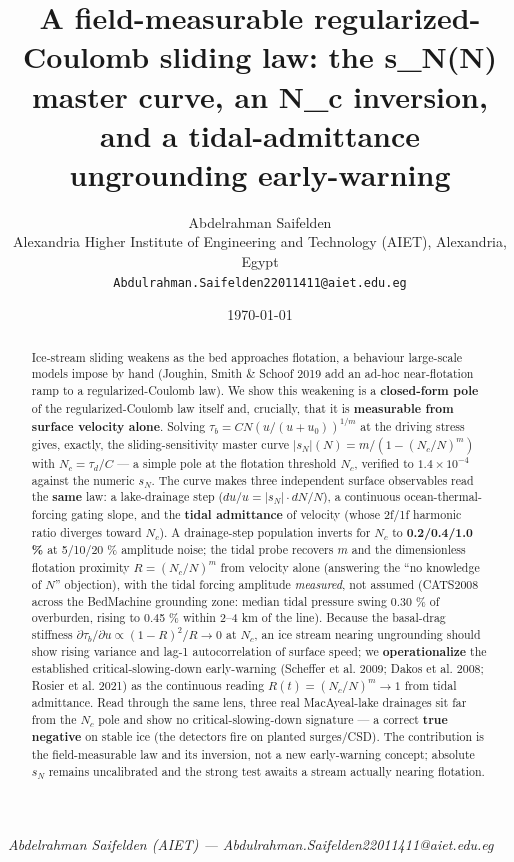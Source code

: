 \documentclass[11pt]{article}
\title{A field-measurable regularized-Coulomb sliding law: the s\_N(N) master curve, an N\_c inversion, and a tidal-admittance ungrounding early-warning}
\author{Abdelrahman Saifelden\\ Alexandria Higher Institute of Engineering and Technology (AIET), Alexandria, Egypt\\ \texttt{Abdulrahman.Saifelden22011411@aiet.edu.eg}}
\date{\today}
\begin{document}
\maketitle

\emph{Abdelrahman Saifelden (AIET) — Abdulrahman.Saifelden22011411@aiet.edu.eg}


\begin{abstract}


Ice-stream sliding weakens as the bed approaches flotation, a behaviour large-scale models impose by hand (Joughin, Smith \& Schoof 2019 add an ad-hoc near-flotation ramp to a regularized-Coulomb law). We show this weakening is a \textbf{closed-form pole} of the regularized-Coulomb law itself and, crucially, that it is \textbf{measurable from surface velocity alone}. Solving $\tau _{b}=C N (u/(u+u_{0}))^{1/m}$ at the driving stress gives, exactly, the sliding-sensitivity master curve $|s_{N}|(N)=m/(1-(N_{c}/N)^{m})$ with $N_{c}=\tau _{d}/C$ — a simple pole at the flotation threshold $N_{c}$, verified to $1.4\times 10^{-4}$ against the numeric $s_{N}$. The curve makes three independent surface observables read the \textbf{same} law: a lake-drainage step ($du/u=|s_{N}|\cdot dN/N$), a continuous ocean-thermal-forcing gating slope, and the \textbf{tidal admittance} of velocity (whose 2f/1f harmonic ratio diverges toward $N_{c}$). A drainage-step population inverts for $N_{c}$ to \textbf{0.2/0.4/1.0 \%} at 5/10/20 \% amplitude noise; the tidal probe recovers $m$ and the dimensionless flotation proximity $R=(N_{c}/N)^{m}$ from velocity alone (answering the ``no knowledge of $N$'' objection), with the tidal forcing amplitude \emph{measured}, not assumed (CATS2008 across the BedMachine grounding zone: median tidal pressure swing 0.30 \% of overburden, rising to 0.45 \% within 2–4 km of the line). Because the basal-drag stiffness $\partial \tau _{b}/\partial u\propto (1-R)^{2}/R\to 0$ at $N_{c}$, an ice stream nearing ungrounding should show rising variance and lag-1 autocorrelation of surface speed; we \textbf{operationalize} the established critical-slowing-down early-warning (Scheffer et al. 2009; Dakos et al. 2008; Rosier et al. 2021) as the continuous reading $R(t)=(N_{c}/N)^{m}\to 1$ from tidal admittance. Read through the same lens, three real MacAyeal-lake drainages sit far from the $N_{c}$ pole and show no critical-slowing-down signature — a correct \textbf{true negative} on stable ice (the detectors fire on planted surges/CSD). The contribution is the field-measurable law and its inversion, not a new early-warning concept; absolute $s_{N}$ remains uncalibrated and the strong test awaits a stream actually nearing flotation.


\end{abstract}
\end{document}
